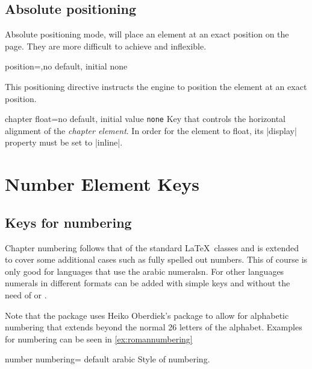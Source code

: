\begin{decription}
\subsection{Absolute positioning}

Absolute positioning mode, will place an element at an exact position on the page. They are more difficult to
achieve and inflexible. 

\begin{docKey}{position}{=,}{no default, initial none}{}

\end{docKey}



This positioning directive instructs the engine to position the element at an exact position.


\begin{docKey}[]{chapter float}{=}{no default, initial value \texttt{none}}
Key that controls the horizontal alignment of the \emph{chapter element}. In order for the
element to float, its |display| property must be set to |inline|.
\end{docKey}
\egroup



\section{Number Element Keys}


\subsection*{Keys for numbering}

Chapter numbering follows that of the standard \LaTeX\ classes and is extended to cover some additional cases such as fully spelled out numbers. This of course is only good for languages that use the arabic numeralsn. For other languages numerals in different formats can be added with simple keys and without the need of  or . 

Note that the package uses Heiko Oberdiek's package  to allow for alphabetic numbering that extends beyond the normal 26 letters of the alphabet. Examples for numbering can be seen in \ref{ex:romannumbering}


\begin{docKey}[phd]{number numbering}{= }{default arabic}
Style of numbering.
\end{docKey}


\end{decription}
